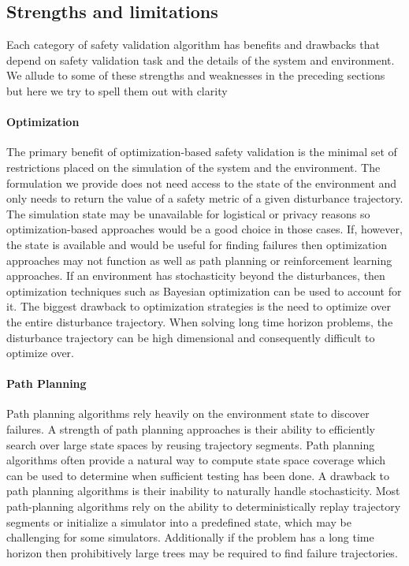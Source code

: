\subsection{Strengths and limitations}

Each category of safety validation algorithm has benefits and drawbacks that depend on safety validation task and the details of the system and environment. We allude to some of these strengths and weaknesses in the preceding sections but here we try to spell them out with clarity

\paragraph{Optimization} The primary benefit of optimization-based safety validation is the minimal set of restrictions placed on the simulation of the system and the environment. The formulation we provide does not need access to the state of the environment and only needs to return the value of a safety metric of a given disturbance trajectory. The simulation state may be unavailable for logistical or privacy reasons so optimization-based approaches would be a good choice in those cases. If, however, the state is available and would be useful for finding failures then optimization approaches may not function as well as path planning or reinforcement learning approaches. If an environment has stochasticity beyond the disturbances, then optimization techniques such as Bayesian optimization can be used to account for it. The biggest drawback to optimization strategies is the need to optimize over the entire disturbance trajectory. When solving long time horizon problems, the disturbance trajectory can be high dimensional and consequently difficult to optimize over. 


\paragraph{Path Planning} Path planning algorithms rely heavily on the environment state to discover failures. A strength of path planning approaches is their ability to efficiently search over large state spaces by reusing trajectory segments. Path planning algorithms often provide a natural way to compute state space coverage which can be used to determine when sufficient testing has been done. A drawback to path planning algorithms is their inability to naturally handle stochasticity. Most path-planning algorithms rely on the ability to deterministically replay trajectory segments or initialize a simulator into a predefined state, which may be challenging for some simulators.  Additionally if the problem has a long time horizon then prohibitively large trees may be required to find failure trajectories. 


